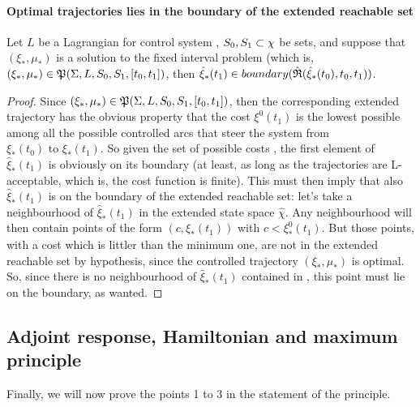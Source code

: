 \paragraph[6.2]{Optimal trajectories lies in the boundary of the extended reachable set}
\begin{teo}
	Let $L$ be a Lagrangian for control system \controlSystem, $S_0,S_1\subset\chi$ be sets, and suppose that $(\xi_*,\mu_*)$ is a solution to the fixed interval problem (which is, $(\xi_*,\mu_*)\in\mathfrak{P}(\Sigma,L,S_0,S_1,[t_0,t_1])$, then $\hat{\xi}_*(t_1)\in boundary(\hat{\mathfrak{R}}(\hat\xi_*(t_0),t_0,t_1))$.
	\label{6-2}
\end{teo}
\begin{proof}
 Since $(\xi_*,\mu_*)\in\mathfrak{P}(\Sigma,L,S_0,S_1,[t_0,t_1])$, then the corresponding extended trajectory has the obvious property that the cost $\xi^0(t_1)$ is the lowest possible among all the possible controlled arcs \controlledTraj\space that steer the system from $\xi_*(t_0)\text{ to }\xi_*(t_1)$. So given the set of possible costs , the first element of $\hat{\xi}_*(t_1)$ is obviously on its boundary (at least, as long as the trajectories are L-acceptable, which is, the cost function is finite). This must then imply that also $\hat{\xi}_*(t_1)$ is on the boundary of the extended reachable set: let's take a neighbourhood of $\hat{\xi}_*(t_1)$ in the extended state space $\hat{\chi}$. Any neighbourhood will then contain points of the form $(c,\xi_*(t_1))$ with $c<\xi_*^0(t_1)$. But those points, with a cost which is littler than the minimum one, are not in the extended reachable set by hypothesis, since the controlled trajectory  $(\xi_*,\mu_*)$ is optimal. So, since there is no neighbourhood of $\hat{\xi}_*(t_1)$ contained in , this point must lie on the boundary, as wanted.
\end{proof}


\subsection[6.3]{Adjoint response, Hamiltonian and maximum principle}
Finally, we will now prove the points 1 to 3 in the statement of the principle. 

